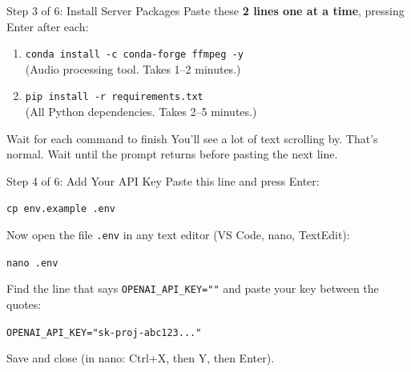 \documentclass[aspectratio=169]{beamer}
\begin{document}
\begin{frame}{Step 3 of 6: Install Server Packages}
Paste these \textbf{2 lines one at a time}, pressing Enter after each:

\vspace{0.3cm}

\begin{enumerate}
    \setlength\itemsep{0.5cm}
    \item \texttt{conda install -c conda-forge ffmpeg -y}\\
          {\small\textcolor{kivagray}{(Audio processing tool. Takes 1--2 minutes.)}}
    \item \texttt{pip install -r requirements.txt}\\
          {\small\textcolor{kivagray}{(All Python dependencies. Takes 2--5 minutes.)}}
\end{enumerate}

\vspace{0.3cm}

\begin{block}{Wait for each command to finish}
You'll see a lot of text scrolling by. That's normal. Wait until the prompt returns before pasting the next line.
\end{block}
\end{frame}

\begin{frame}{Step 4 of 6: Add Your API Key}
Paste this line and press Enter:

\vspace{0.1cm}

\begin{center}
\large \texttt{cp env.example .env}
\end{center}

\vspace{0.2cm}

Now open the file \texttt{.env} in any text editor (VS Code, nano, TextEdit):

\begin{center}
\large \texttt{nano .env}
\end{center}

\vspace{0.2cm}

Find the line that says \texttt{OPENAI\_API\_KEY=""} and paste your key between the quotes:

\vspace{0.1cm}

\begin{center}
\texttt{OPENAI\_API\_KEY="sk-proj-abc123..."}
\end{center}

\vspace{0.1cm}

Save and close (in nano: Ctrl+X, then Y, then Enter).
\end{frame}
\end{document}
